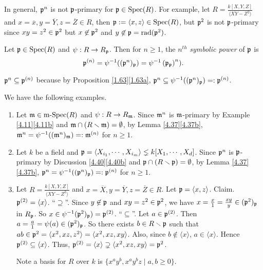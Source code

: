 \begin{example}\label{4.41}
    In general, $\mathfrak{p}^{n}$ is not $\mathfrak{p}$-primary for $\mathfrak{p} \in \operatorname{Spec}(R)$. For example, let $R = \frac{k[X,Y,Z]}{\langle XY-Z^{2} \rangle}$ and $x = \overline x,y = \overline Y, z = \overline Z \in R$, then $\mathfrak{p} := \langle x,z \rangle \in \operatorname{Spec}(R)$, but $\mathfrak{p}^{2}$ is not $\mathfrak{p}$-primary since $xy = z^{2} \in \mathfrak{p}^{2}$ but $x \not \in \mathfrak{p}^{2}$ and $y \not \in \mathfrak{p} = \operatorname{rad}(\mathfrak{p}^{2})$.
\end{example}

\begin{definition}\label{4.42}
    Let $\mathfrak{p} \in \operatorname{Spec}(R)$ and $\psi: R \to R_{\mathfrak{p}}$. Then for $n \geq 1$, the $n^{th}$ \emph{symbolic power} of $\mathfrak{p}$ is \[\mathfrak{p}^{(n)} = \psi^{-1}((\mathfrak{p}^{n})_{\mathfrak{p}}) = \psi^{-1}\left( \mathfrak{p}_{\mathfrak{p}} \right)^{n}).\] 
\end{definition}

\begin{note}\label{4.43}
    $\mathfrak{p}^{n} \subseteq \mathfrak{p}^{(n)}$ because by Proposition \ref{1.63}\ref{1.63a}, $\mathfrak{p}^{n} \subseteq \psi^{-1}((\mathfrak{p}^{n})_{\mathfrak{p}}) =: \mathfrak{p}^{(n)}$.
\end{note}

\begin{example}\label{4.44}
    We have the following examples.
    \begin{enumerate}
        \item\label{4.44a}
            Let $\mathfrak{m} \in \operatorname{m-Spec}(R)$ and $\psi: R \to R_{\mathfrak{m}}$. Since $\mathfrak{m}^{n}$ is $\mathfrak{m}$-primary by Example \ref{4.11}\ref{4.11b} and $\mathfrak{m} \cap (R \smallsetminus \mathfrak{m}) = \emptyset$, by Lemma \ref{4.37}\ref{4.37b}, $\mathfrak{m}^{n} = \psi^{-1}((\mathfrak{m}^{n})_{\mathfrak{m}}) =: \mathfrak{m}^{(n)}$ for $n \geq 1$. 
        \item\label{4.44b} Let $k$ be a field and $\mathfrak{p} = \langle X_{i_1}, \cdots, X_{i_m} \rangle \lneq k[X_1,\cdots,X_d]$. Since $\mathfrak{p}^{n}$ is $\mathfrak{p}$-primary by Discussion \ref{4.40}\ref{4.40b} and $\mathfrak{p} \cap (R \smallsetminus \mathfrak{p}) = \emptyset$, by Lemma \ref{4.37}\ref{4.37b}, $\mathfrak{p}^{n} = \psi^{-1}((\mathfrak{p}^{n})_{\mathfrak{p}}) =: \mathfrak{p}^{(n)}$ for $n \geq 1$.
        \item\label{4.44c} Let $R = \frac{k[X,Y,Z]}{\langle XY-Z^{2} \rangle}$ and $x = \overbar X, y = \overline Y, z = \overbar Z \in R$. Let $\mathfrak{p} = \langle x, z \rangle$. Claim. $\mathfrak{p}^{(2)} = \langle x \rangle$. ``$\supseteq$''. Since $y \not \in \mathfrak{p}$ and $xy = z^{2} \in \mathfrak{p}^{2}$, we have $x = \frac{x}{1} = \frac{xy}{y} \in (\mathfrak{p}^{2})_{\mathfrak{p}}$ in $R_{\mathfrak{p}}$. So $x \in \psi^{-1}(\mathfrak{p}^{2})_{\mathfrak{p}}) = \mathfrak{p}^{(2)}$. ``$\subseteq$''. Let $a \in \mathfrak{p}^{(2)}$. Then $a = \frac{a}{1} = \psi(a) \in (\mathfrak{p}^{2})_{\mathfrak{p}}$. So there exists $b \in R \smallsetminus \mathfrak{p}$ such that $ab \in \mathfrak{p}^{2} = \langle x^{2},xz,z^{2} \rangle = \langle x^{2}, xz,xy \rangle$. Also, since $b \not \in \langle x \rangle$, $a \in \langle x \rangle$. Hence $\mathfrak{p}^{(2)} \subseteq \langle x \rangle$. Thus, $\mathfrak{p}^{(2)} = \langle x \rangle \supsetneq \langle x^{2},xz,xy \rangle = \mathfrak{p}^{2}$. \par Note a basis for $R$ over $k$ is $\{x^{a}y^{b},x^{a}y^{b}z \mid a,b \geq 0\}$. 
    \end{enumerate}
\end{example}


